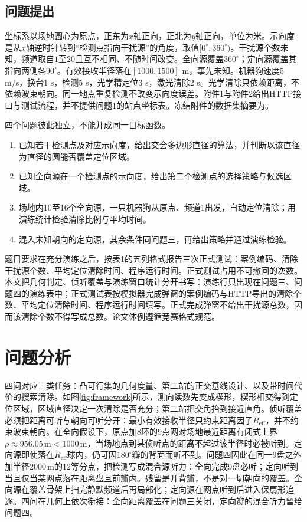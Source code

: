\documentclass{cumcmthesis}
\begin{document}
\subsection{问题提出}

坐标系以场地圆心为原点，正东为$x$轴正向，正北为$y$轴正向，单位为米。示向度是从$x$轴逆时针转到“检测点指向干扰源”的角度，取值$[0^\circ,360^\circ)$。干扰源个数未知，频道取自$1$至$20$且互不相同、不随时间改变。全向源覆盖$360^\circ$；定向源覆盖其指向两侧各$90^\circ$。有效接收半径落在$[1000,1500]$ m，事先未知。机器狗速度5 m/s，换台1 s，检测5 s，光学精定位3 s，激光清除2 s。光学清除只依赖距离，不依赖波束朝向。同一地点重复检测不改变示向度误差。附件1与附件2给出HTTP接口与测试流程，并不提供问题1的站点坐标表。冻结附件的数据集摘要为。

四个问题彼此独立，不能并成同一目标函数。

\begin{enumerate}
\item 已知若干检测点及对应示向度，给出交会多边形直径的算法，并判断以该直径为直径的圆能否覆盖定位区域。
\item 已知全向源在一个检测点的示向度，给出第二个检测点的选择策略与候选区域。
\item 场地内10至16个全向源，一只机器狗从原点、频道1出发，自动定位清除；用演练统计检验清除比例与平均时间。
\item 混入未知朝向的定向源，其余条件同问题三，再给出策略并通过演练检验。
\end{enumerate}

题目要求在充分演练之后，按表1的五列格式报告三次正式测试：案例编码、清除干扰源个数、平均定位清除时间、程序运行时间。正式测试占用不可撤回的次数。本文把几何判定、侦听覆盖与演练窗口统计分开书写：演练行只出现在问题三、问题四的演练表中；正式测试表按模拟器完成弹窗的案例编码与HTTP导出的清除个数、平均定位清除时间、程序运行时间填写。正式完成弹窗不给出干扰源总数，因而该清除个数不得写成总数。论文体例遵循竞赛格式规范\cite{format}。

\section{问题分析}

四问对应三类任务：凸可行集的几何度量、第二站的正交基线设计、以及带时间代价的搜索清除。如图\ref{fig:framework}所示，测向读数先变成楔形，楔形相交得到定位区域，区域直径决定一次清除是否充分；第二站把交角抬到接近直角。侦听覆盖必须把距离可听与朝向可听分开：最小有效接收半径只约束距离因子$R_{\mathrm{eff}}$，并不约束波束朝向。在全向假设下，原点加8环的9点网对场地最近距离有闭式上界$\rho\approx 956.05\,\mathrm{m}<1000\,\mathrm{m}$，当场地点到某侦听点的距离不超过该半径时必被听到。定向源即使落在$R_{\mathrm{eff}}$球内，仍可因$180^\circ$瓣的背面而听不到。问题四因此在同一9盘之外加半径$2000\,\mathrm{m}$的12等分点，把检测写成混合源听力：全向完成9盘必听；定向听到当且仅当某网点落在距离盘且前瓣内。残留是开背瓣，不是对一切朝向的覆盖。全向源在覆盖骨架上扫完静默频道后再局部化；定向源在网点听到后进入保扇形追逐。四问在几何上依次衔接：全向距离覆盖在问题三关闭，定向瓣的混合听力留给问题四。
\end{document}

